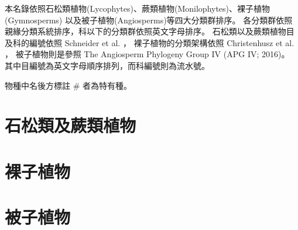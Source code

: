 本名錄依照石松類植物(Lycophytes)、蕨類植物(Monilophytes)、裸子植物(Gymnosperms)
以及被子植物(Angiosperms)等四大分類群排序。
各分類群依照親緣分類系統排序，科以下的分類群依照英文字母排序。
石松類以及蕨類植物目及科的編號依照 Schneider et al. \citeyearpar{Schneider:2016hr}，
裸子植物的分類架構依照 Christenhusz et al. \citeyearpar{Christenhusz:2011wm}，
被子植物則是參照 The Angiosperm Phylogeny Group IV (APG IV; 2016)。
其中目編號為英文字母順序排列，而科編號則為流水號。

\noindent 物種中名後方標註 \# 者為特有種。\\
\begin{multicols}{2}
\section{石松類及蕨類植物}

\section{裸子植物}

\section{被子植物}

\end{multicols}
